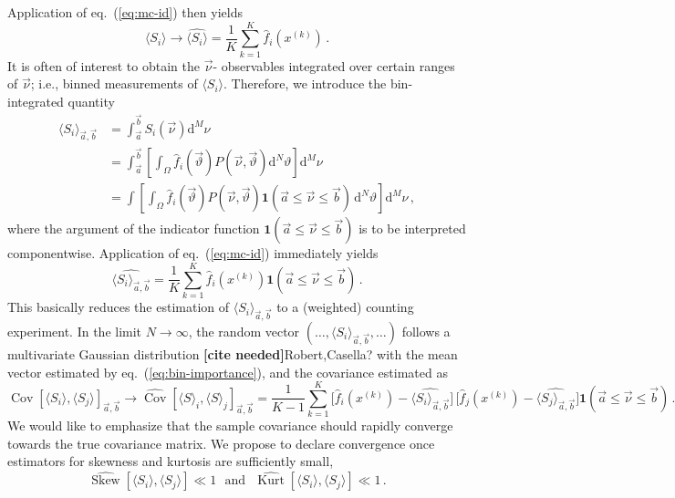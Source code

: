 \documentclass[aps,prd,reprint,nofootinbib,preprintnumbers]{revtex4}
\newcommand{\dd}{\text{d}}
\newcommand{\refeq}[1]{eq.~(\ref{eq:#1})}
\newcommand{\nuvec}{\vec{\nu}}
\newcommand{\thvec}{\vec{\vartheta}}
\renewcommand{\theta}{\vartheta}
\newcommand{\aver}[1]{\langle #1 \rangle}
\newcommand{\est}[1]{\widehat{#1}}
\DeclareMathOperator{\cov}{Cov}
\DeclareMathOperator{\kurt}{Kurt}
\newcommand{\fred}[1]{{\color{brown!85!black}#1}}
\newcommand{\citeneeded}{{\color{red}\bf [cite needed]}}
\begin{document}
Application of \refeq{mc-id} then yields
\begin{equation}
    \langle S_i\rangle \to \widehat{\langle S_i\rangle} = \frac{1}{K} \sum_{k=1}^{K} \hat{f}_i(x^{(k)})\,.
\end{equation}
It is often of interest to obtain the $\nuvec$- observables integrated
over certain ranges of $\nuvec$; i.e., binned measurements of $\langle
S_i\rangle$.
Therefore, we introduce the bin-integrated quantity
\begin{align}
    \langle S_i\rangle_{\vec{a},\vec{b}}
    & = \int_{\vec{a}}^{\vec{b}} S_i(\nuvec) \dd^M \nu\\
    & = \int_{\vec{a}}^{\vec{b}} \left[\int_{\Omega} \hat{f}_i(\thvec) P(\nuvec,\thvec) \dd^N\theta\right]\dd^M \nu\\
    & = \int \left[\int_{\Omega} \hat{f}_i(\thvec) P(\nuvec,\thvec)
        \mathbf{1}(\vec{a} \le \nuvec \le \vec{b})\,
        \dd^N\theta\right]\dd^M \nu\,,
\end{align}
where the argument of the indicator function $ \mathbf{1}(\vec{a} \le
\nuvec \le \vec{b})$ is to be interpreted componentwise.
Application of \refeq{mc-id} immediately yields
\begin{equation}
    \label{eq:bin-importance}
    \widehat{\langle S_i\rangle_{\vec{a},\vec{b}}}
    = \frac{1}{K} \sum_{k=1}^{K} \hat{f}_i(x^{(k)})         \mathbf{1}(\vec{a} \le \nuvec \le \vec{b})\,.
\end{equation}
This basically reduces the estimation of
$\aver{S_i}_{\vec{a},\vec{b}}$ to a (weighted) counting experiment. In
the limit $N \to \infty$, the random vector $( \dots,
\aver{S_i}_{\vec{a},\vec{b}}, \dots)$ follows a multivariate Gaussian
distribution \citeneeded\fred{Robert,Casella?}
with the mean vector estimated by \refeq{bin-importance}, and the covariance
estimated as
\begin{equation}
    \cov[\aver{S_i},\aver{S_j}]_{\vec{a},\vec{b}} \to \est{\cov}[\aver{S}_i, \aver{S}_j]_{\vec{a},\vec{b}}
        = \frac{1}{K - 1} \sum_{k=1}^{K} \big[\hat{f}_i(x^{(k)}) - \est{\langle S_i\rangle_{\vec{a},\vec{b}}}\big]\,\big[\hat{f}_j(x^{(k)}) - \widehat{\langle S_j\rangle_{\vec{a},\vec{b}}}\big]
        \mathbf{1}(\vec{a} \le \nuvec \le \vec{b})\,.
\end{equation}
We would like to emphasize that the sample covariance should rapidly converge towards the true covariance matrix.
We propose to declare convergence once estimators for skewness and kurtosis are sufficiently small,
\begin{equation}
    \est{\operatorname{Skew}}[\aver{S_i},\aver{S_j}] \ll 1\,\,\text{ and }\,\,\est{\kurt}[\aver{S_i},\aver{S_j}] \ll 1\,.
\end{equation}
\end{document}
